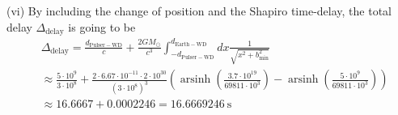 \documentclass[12pt]{article}
\begin{document}
(vi) By including the change of position and the Shapiro time-delay, the total delay $\Delta_{\mathrm{delay}}$ is going to be
\begin{align}
&\Delta_{\mathrm{delay}} = \frac{d_{\mathrm{Pulser-WD}}}{c} + \frac{2 G M_{\odot}}{c^3} \int^{d_{\mathrm{Earth-WD}}}_{- d_{\mathrm{Pulser-WD}}} dx \frac{1}{\sqrt{x^2 + b_{\mathrm{min}}^2}} \\
&\approx  \frac{5 \cdot 10^{9}}{3 \cdot 10^{8}} + \frac{2 \cdot 6.67 \cdot 10^{-11} \cdot 2 \cdot 10^{30}}{(3 \cdot 10^{8})^3} \left( \operatorname{arsinh}\left(\frac{3.7 \cdot 10^{19}}{69811 \cdot 10^{3}}\right) - \operatorname{arsinh}\left(\frac{5 \cdot 10^{9}}{69811 \cdot 10^{3}}\right) \right) \nonumber \\
&\approx 16.6667 + 0.0002246 = 16.6669246 ~\mathrm{s}
\end{align}
\end{document}
